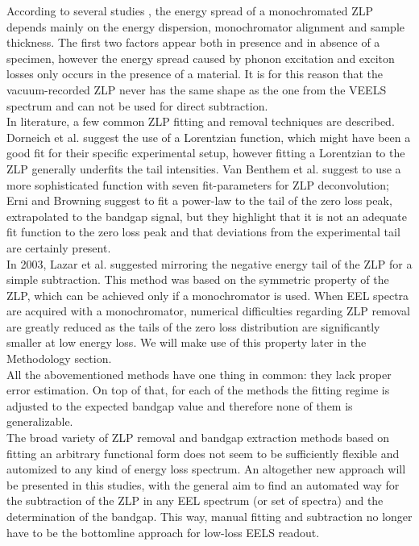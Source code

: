 \documentclass[11pt,a4paper]{article}
\numberwithin{equation}{section}
\numberwithin{figure}{section}
\numberwithin{table}{section}
\begin{document}
According to several studies \cite{Park:2008, Stoger:2008}, the energy spread of a monochromated ZLP depends mainly on the energy dispersion, monochromator alignment and sample thickness. The first two factors appear both in presence and in absence of a specimen, however the energy spread caused by phonon excitation and exciton losses only occurs in the presence of a material. It is for this reason that the vacuum-recorded ZLP never has the same shape as the one from the VEELS spectrum and can not be used for direct subtraction. \\ 
In literature, a few common ZLP fitting and removal techniques are described. Dorneich et al. \cite{Dorneich:1998} suggest the use of a Lorentzian function, which might have been a good fit for their specific experimental setup, however fitting a Lorentzian to the ZLP generally underfits the tail intensities. Van Benthem et al. \cite{Benthem:2001} suggest to use a more sophisticated function with seven fit-parameters for ZLP deconvolution; Erni and Browning \cite{Erni:2005} suggest to fit a power-law to the tail of the zero loss peak, extrapolated to the bandgap signal, but they highlight that it is not an adequate fit function to the zero loss peak and that deviations from the experimental tail are certainly present.\\
In 2003, Lazar et al. \cite{Lazar:2003} suggested mirroring the negative energy tail of the ZLP for a simple subtraction. This method was based on the symmetric property of the ZLP, which can be achieved only if a monochromator is used. When EEL spectra are acquired with a monochromator, numerical difficulties regarding ZLP removal are greatly reduced as the tails of the zero loss distribution are significantly smaller at low energy loss. We will make use of this property later in the Methodology section.\\
All the abovementioned methods have one thing in common: they lack proper error estimation. On top of that, for each of the methods the fitting regime is adjusted to the expected bandgap value and therefore none of them is generalizable. \\

The broad variety of ZLP removal and bandgap extraction methods based on fitting an arbitrary functional form does not seem to be sufficiently flexible and automized to any kind of energy loss spectrum. An altogether new approach will be presented in this studies, with the general aim to find an automated way for the subtraction of the ZLP in any EEL spectrum (or set of spectra) and the determination of the bandgap. This way, manual fitting and subtraction no longer have to be the bottomline approach for low-loss EELS readout. 
\end{document}
